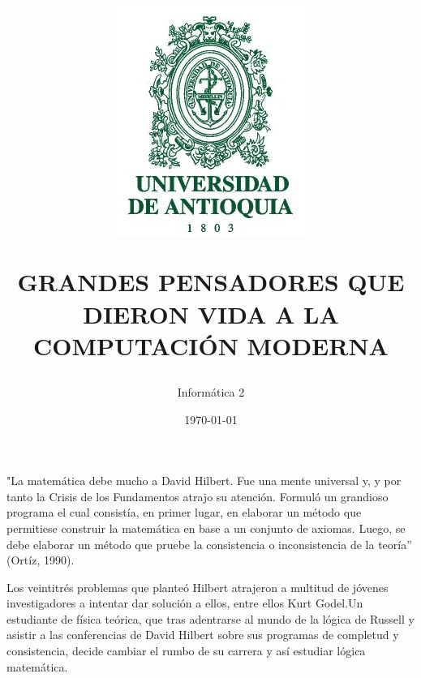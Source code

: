 \documentclass{article}
\title{      \includegraphics[scale=0.5]{logo-universidad-de-antioquia.png}

GRANDES PENSADORES QUE DIERON VIDA A LA COMPUTACIÓN MODERNA}
\author{Informática 2
}
\date{\today}
\begin{document}
\maketitle 

"La matemática debe mucho a David Hilbert. Fue una mente universal y, y por tanto la Crisis de los Fundamentos atrajo su atención. Formuló un grandioso programa  el cual consistía, en primer lugar, en elaborar un método que permitiese construir la matemática en base a un conjunto de axiomas. Luego, se debe elaborar un método que pruebe la consistencia o inconsistencia de la teoría” (Ortíz, 1990).

Los veintitrés problemas que planteó Hilbert atrajeron a multitud de jóvenes investigadores a intentar dar solución a ellos, entre ellos Kurt Godel.Un estudiante de física teórica, que tras adentrarse al mundo de la lógica de Russell y asistir a las conferencias de David Hilbert sobre sus programas de completud y consistencia, decide cambiar el rumbo de su carrera y así estudiar lógica matemática.
\end{document}
